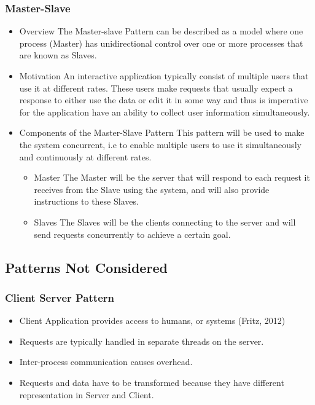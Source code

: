 \documentclass[a4paper,12pt]{article}
\begin{document}
\subsubsection{Master-Slave}
\begin{itemize}
\item{Overview}
\newline
The Master-slave Pattern can be described as  a model where one process (Master) has unidirectional control over one or more processes that are known as Slaves. 

\item{Motivation}
\newline
An interactive application typically consist of multiple users that use it at different rates. These users make requests that usually expect a response to either use the data or edit it in some way and thus is imperative for the application have an ability to collect user information simultaneously.

\item{Components of the Master-Slave Pattern}
\newline
This pattern will be used to make the system concurrent, i.e to enable multiple users to use it simultaneously and continuously at different rates.
\begin{itemize}
\item{Master} 
\newline
The Master will be the server that will respond to each request it receives from the Slave using the system, and will also provide instructions to these Slaves.
\item{Slaves}
\newline 
The Slaves will be the clients connecting to the server and will  send requests concurrently to achieve a certain goal.
\end{itemize}
\end{itemize}

\subsection{Patterns Not Considered}
\subsubsection{Client Server Pattern}

\begin{itemize}

\item Client Application provides access to humans, or systems (Fritz, 2012)
\item Requests are typically handled in separate threads on the server.
\item Inter-process communication causes overhead.
\item Requests and data have to be transformed because they have different representation in Server and Client.
\end{itemize}
\end{document}
